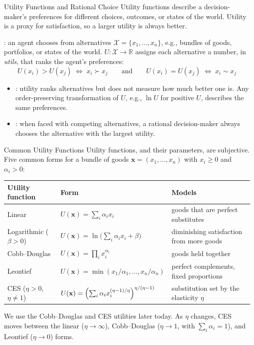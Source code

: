 \documentclass[aspectratio=169,11pt]{beamer}
\newcommand{\bx}{\mathbf{x}}
\begin{document}
\begin{frame}{Utility Functions and Rational Choice}
  Utility functions describe a decision-maker's preferences for different
  choices, outcomes, or states of the world. Utility is a proxy for
  satisfaction, so a larger utility is always better.

  \vspace{0.5em}
  : an agent chooses from alternatives
  $\mathcal{X}=\{x_1,\dots,x_n\}$, e.g., bundles of goods, portfolios, or states
  of the world. $U:\mathcal{X}\rightarrow\mathbb{R}$ assigns each alternative a
  number, in \emph{utils}, that ranks the agent's preferences:
  \[
    \boxed{U(x_i)>U(x_j)\;\Longleftrightarrow\;x_i\succ x_j
      \qquad\text{and}\qquad
      U(x_i)=U(x_j)\;\Longleftrightarrow\;x_i\sim x_j}
  \]
  \begin{itemize}\setlength{\itemsep}{0.4em}
    \item {}: utility ranks alternatives but does not measure how
      much better one is. Any order-preserving transformation of $U$, e.g.,
      $\ln U$ for positive $U$, describes the same preferences.
    \item {}: when faced with competing alternatives, a rational
      decision-maker always chooses the alternative with the largest utility.
  \end{itemize}
\end{frame}

\begin{frame}{Common Utility Functions}
  Utility functions, and their parameters, are subjective. Five common forms for
  a bundle of goods $\bx=(x_1,\dots,x_n)$ with $x_i\ge0$ and $\alpha_i>0$:

  \vspace{0.4em}
  {\footnotesize
  \begin{tabular}{@{}lll@{}}
    \toprule
    \textbf{Utility function} & \textbf{Form} & \textbf{Models}\\
    \midrule
    Linear & $U(\bx)=\sum_i\alpha_ix_i$ & goods that are perfect substitutes\\[0.2em]
    Logarithmic ($\beta>0$) & $U(\bx)=\ln\bigl(\sum_i\alpha_ix_i+\beta\bigr)$ & diminishing satisfaction from more goods\\[0.2em]
    Cobb--Douglas & $U(\bx)=\prod_ix_i^{\alpha_i}$ & goods held together\\[0.2em]
    Leontief & $U(\bx)=\min\left(x_1/\alpha_1,\dots,x_n/\alpha_n\right)$ & perfect complements, fixed proportions\\[0.2em]
    CES ($\eta>0$, $\eta\ne1$) & $U(\bx)=\Bigl(\sum_i\alpha_ix_i^{(\eta-1)/\eta}\Bigr)^{\eta/(\eta-1)}$ & substitution set by the elasticity $\eta$\\
    \bottomrule
  \end{tabular}}

  \vspace{0.8em}
  We use the Cobb--Douglas and CES utilities later today. As $\eta$ changes,
  CES moves between the linear ($\eta\to\infty$), Cobb--Douglas ($\eta\to1$, with
  $\sum_i\alpha_i=1$), and Leontief ($\eta\to0$) forms.
\end{frame}
\end{document}
